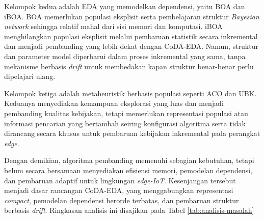 Kelompok kedua adalah EDA yang memodelkan dependensi, yaitu BOA dan iBOA. 
BOA memerlukan populasi eksplisit serta pembelajaran struktur \textit{Bayesian network} sehingga relatif mahal dari sisi memori dan komputasi. 
iBOA menghilangkan populasi eksplisit melalui pembaruan statistik secara inkremental dan menjadi pembanding yang lebih dekat dengan CoDA-EDA. 
Namun, struktur dan parameter model diperbarui dalam proses inkremental yang sama, tanpa mekanisme berbasis \textit{drift} untuk membedakan kapan struktur benar-benar perlu dipelajari ulang.

Kelompok ketiga adalah metaheuristik berbasis populasi seperti ACO dan UBK. 
Keduanya menyediakan kemampuan eksplorasi yang luas dan menjadi pembanding kualitas kebijakan, tetapi memerlukan representasi populasi atau informasi pencarian yang bertambah seiring konfigurasi algoritma serta tidak dirancang secara khusus untuk pembaruan kebijakan inkremental pada perangkat \textit{edge}.

Dengan demikian, algoritma pembanding memenuhi sebagian kebutuhan, tetapi belum secara bersamaan menyediakan efisiensi memori, pemodelan dependensi, dan pembaruan adaptif untuk lingkungan \textit{edge-IoT}. 
Kesenjangan tersebut menjadi dasar rancangan CoDA-EDA, yang menggabungkan representasi \textit{compact}, pemodelan dependensi berorde terbatas, dan pembaruan struktur berbasis \textit{drift}. 
Ringkasan analisis ini disajikan pada Tabel \ref{tab:analisis-masalah}

